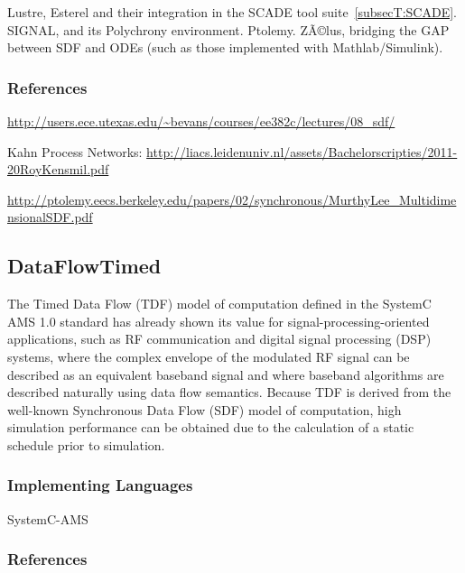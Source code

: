 Lustre, Esterel and their integration in the SCADE tool suite~\ref{subsecT:SCADE}. SIGNAL, and its Polychrony environment. Ptolemy. ZÃ©lus, bridging the GAP between SDF and ODEs (such as those implemented with Mathlab/Simulink).



\subsubsection{References}


\url{http://users.ece.utexas.edu/~bevans/courses/ee382c/lectures/08_sdf/}

Kahn Process Networks: \url{http://liacs.leidenuniv.nl/assets/Bachelorscripties/2011-20RoyKensmil.pdf}

\url{http://ptolemy.eecs.berkeley.edu/papers/02/synchronous/MurthyLee_MultidimensionalSDF.pdf}




\subsection{DataFlowTimed}
\label{subsecF:DataFlowTimed}

The Timed Data Flow (TDF) model of computation defined in the SystemC AMS 1.0 standard has already shown its value for signal-processing-oriented applications, such as RF communication and digital signal processing (DSP) systems, where the complex envelope of the modulated RF signal can be described as an equivalent baseband signal and where baseband algorithms are described naturally using data flow semantics. Because TDF is derived from the well-known Synchronous Data Flow (SDF) model of computation, high simulation performance can be obtained due to the calculation of a static schedule prior to simulation.

\subsubsection{Implementing Languages}

SystemC-AMS


\subsubsection{References}

